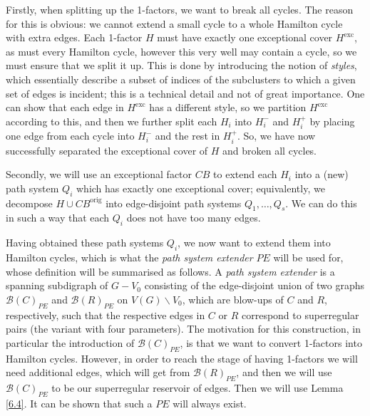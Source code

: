 \documentclass[10pt,letterpaper, reqno]{amsart}
\theoremstyle{definition}
\numberwithin{equation}{section}
\begin{document}
Firstly, when splitting up the 1-factors, we want to break all cycles. The reason for this is obvious: we cannot extend a small cycle to a whole Hamilton cycle with extra edges. Each 1-factor $H$ must have exactly one exceptional cover $H^\text{exc}$, as must every Hamilton cycle, however this very well may contain a cycle, so we must ensure that we split it up. This is done by introducing the notion of \textit{styles}, which essentially describe a subset of indices of the subclusters to which a given set of edges is incident; this is a technical detail and not of great importance. One can show that each edge in $H^\text{exc}$ has a different style, so we partition $H^\text{exc}$ according to this, and then we further split each $H_i$ into $H^-_i$ and $H^+_i$ by placing one edge from each cycle into $H^-_i$ and the rest in $H^+_i$. So, we have now successfully separated the exceptional cover of $H$ and broken all cycles.

Secondly, we will use an exceptional factor $CB$ to extend each $H_i$ into a (new) path system $Q_i$ which has exactly one exceptional cover; equivalently, we decompose $H \cup CB^\text{orig}$ into edge-disjoint path systems $Q_1,\dots, Q_s$. We can do this in such a way that each $Q_i$ does not have too many edges. 

Having obtained these path systems $Q_i$, we now want to extend them into Hamilton cycles, which is what the \textit{path system extender} $PE$ will be used for, whose definition will be summarised as follows. A \textit{path system extender} is a spanning subdigraph of $G-V_0$ consisting of the edge-disjoint union of two graphs $\mathcal{B}(C)_{PE}$ and $\mathcal{B}(R)_{PE}$ on $V(G)\backslash V_0$, which are blow-ups of $C$ and $R$, respectively, such that the respective edges in $C$ or $R$ correspond to superregular pairs (the variant with four parameters). The motivation for this construction, in particular the introduction of $\mathcal{B}(C)_{PE}$,  is that we want to convert 1-factors into Hamilton cycles. However, in order to reach the stage of having 1-factors we will need additional edges, which will get from $\mathcal{B}(R)_{PE}$, and then we will use $\mathcal{B}(C)_{PE}$ to be our superregular reservoir of edges. Then we will use Lemma \ref{6.4}. It can be shown that such a $PE$ will always exist.
\end{document}

